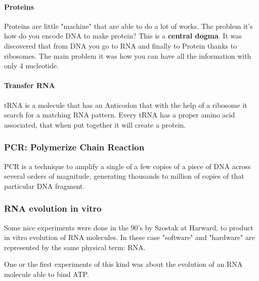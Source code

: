 \paragraph*{Proteins} Proteins are little "machine" that are able to do a lot
of works. The problem it's how do you encode DNA to make protein? This is a
\textbf{central dogma}. It was discovered that from DNA you go to RNA and
finally to Protein thanks to ribosomes.
The main problem it was how you can have all the information with only
4 nucleotide.

\paragraph*{Transfer RNA} tRNA is a molecule that has an Anticodon that with
the help of a ribosome it search for a matching RNA pattern. Every tRNA has a
proper amino acid associated, that when put together it will create a protein.

\subsubsection{PCR: Polymerize Chain Reaction}
PCR is a technique to amplify a single of a few copies of a piece of DNA across
several orders of magnitude, generating thousands to million of copies of that
particular DNA fragment.

\subsubsection{RNA evolution in vitro}
Some nice experiments were done in the 90's by Szostak at Harward, to product
in vitro evolution of RNA molecules. In these case "software" and "hardware"
are represented by the same physical term: RNA.

One or the first experiments of this kind was about the evolution of an RNA
molecule able to bind ATP.
